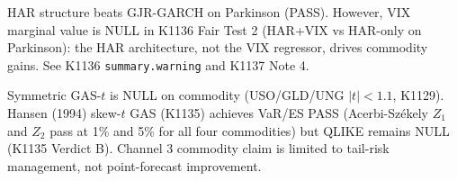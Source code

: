 \begin{table}[H]
\begin{threeparttable}
\begin{tablenotes}
\item[\tnote{b}] HAR structure beats GJR-GARCH on Parkinson (PASS). However, VIX marginal value is NULL
  in K1136 Fair Test 2 (HAR+VIX vs HAR-only on Parkinson): the HAR architecture, not the VIX regressor,
  drives commodity gains. See K1136 \texttt{summary.warning} and K1137 Note 4.
\item[\tnote{†}] Symmetric GAS-$t$ is NULL on commodity (USO/GLD/UNG $|t| < 1.1$, K1129).
  Hansen (1994) skew-$t$ GAS (K1135) achieves VaR/ES PASS (Acerbi-Sz\'{e}kely $Z_1$ and $Z_2$ pass at
  1\% and 5\% for all four commodities) but QLIKE remains NULL (K1135 Verdict B).
  Channel 3 commodity claim is limited to tail-risk management, not point-forecast improvement.
\end{tablenotes}
\end{threeparttable}
\end{table}
